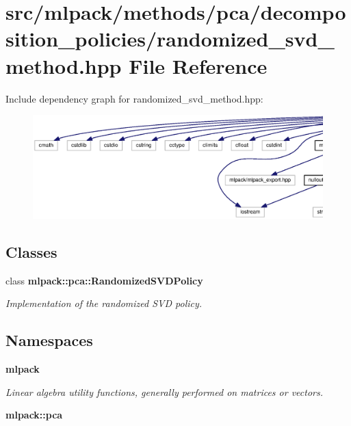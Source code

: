 \section{src/mlpack/methods/pca/decomposition\+\_\+policies/randomized\+\_\+svd\+\_\+method.hpp File Reference}
\label{randomized__svd__method_8hpp}
Include dependency graph for randomized\+\_\+svd\+\_\+method.\+hpp\+:
\nopagebreak
\begin{figure}[H]
\begin{center}
\leavevmode
\includegraphics[width=350pt]{randomized__svd__method_8hpp__incl}
\end{center}
\end{figure}
\subsection*{Classes}
\begin{DoxyCompactItemize}
\item 
class {\bf mlpack\+::pca\+::\+Randomized\+S\+V\+D\+Policy}
\begin{DoxyCompactList}\small\item\em Implementation of the randomized S\+VD policy. \end{DoxyCompactList}\end{DoxyCompactItemize}
\subsection*{Namespaces}
\begin{DoxyCompactItemize}
\item 
 {\bf mlpack}
\begin{DoxyCompactList}\small\item\em Linear algebra utility functions, generally performed on matrices or vectors. \end{DoxyCompactList}\item 
 {\bf mlpack\+::pca}
\end{DoxyCompactItemize}


